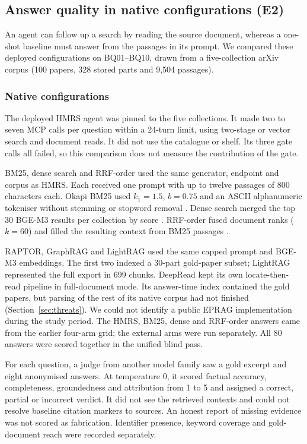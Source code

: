 \subsection{Answer quality in native configurations (E2)}
\label{sec:e10}
\label{sec:external-baselines}
An agent can follow up a search by reading the source document, whereas a
one-shot baseline must answer from the passages in its prompt. We compared
these deployed configurations on BQ01--BQ10, drawn from a five-collection
arXiv corpus (100 papers, 328 stored parts and 9{,}504 passages).

\subsubsection{Native configurations}
The deployed HMRS agent was pinned to the five collections. It made two to
seven MCP calls per question within a 24-turn limit, using two-stage or
vector search and document reads. It did not use the catalogue or shelf.
Its three gate calls all failed, so this comparison does not measure the
contribution of the gate.

BM25, dense search and RRF-order used the same generator, endpoint and
corpus as HMRS. Each received one prompt with up to twelve passages of
800 characters each. Okapi BM25 used $k_1=1.5$, $b=0.75$ and an ASCII
alphanumeric tokeniser without stemming or stopword removal \citep{bm25}.
Dense search merged the top 30 BGE-M3 results per collection by score
\citep{bge-m3}. RRF-order fused document ranks ($k=60$) and filled the
resulting context from BM25 passages \citep{rrf-cormack}.

RAPTOR, GraphRAG and LightRAG used the same capped prompt and BGE-M3
embeddings. The first two indexed a 30-part gold-paper subset; LightRAG
represented the full export in 699 chunks. DeepRead kept its own
locate-then-read pipeline in full-document mode. Its answer-time index
contained the gold papers, but parsing of the rest of its native corpus
had not finished (Section~\ref{sec:threats}). We could not identify a
public EPRAG implementation during the study period. The HMRS, BM25, dense
and RRF-order answers came from the earlier four-arm grid; the external
arms were run separately. All 80 answers were scored together in the
unified blind pass.

For each question, a judge from another model family saw a gold excerpt
and eight anonymised answers. At temperature 0, it scored factual
accuracy, completeness, groundedness and attribution from 1 to 5 and
assigned a correct, partial or incorrect verdict. It did not see the
retrieved contexts and could not resolve baseline citation markers to
sources. An honest report of missing evidence was not scored as fabrication.
Identifier presence, keyword coverage and gold-document reach were
recorded separately.

